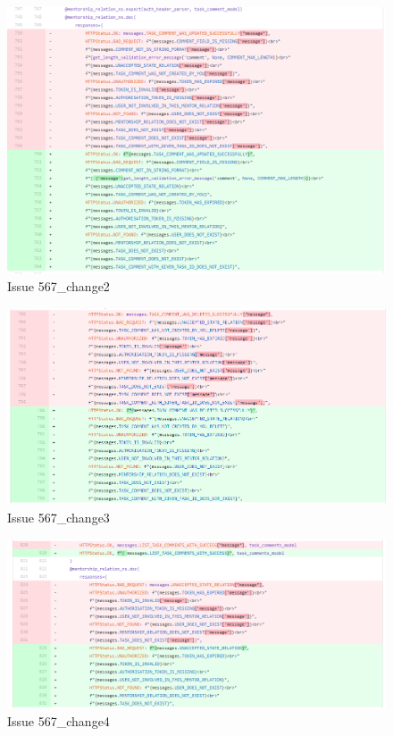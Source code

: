 \documentclass{article}
\begin{document}
\begin{figure}[tph!]
\centerline{\includegraphics[totalheight=15cm, width=16cm]{567Changes_2.png}}
    \caption{Issue 567\_change2}
    \label{fig:verticalcell}
\end{figure}
\begin{figure}[tph!]
\centerline{\includegraphics[totalheight=15cm, width=16cm]{567Changes_3.png}}
    \caption{Issue 567\_change3}
    \label{fig:verticalcell}
\end{figure}
\begin{figure}[tph!]
\centerline{\includegraphics[totalheight=15cm, width=16cm]{567Changes_4.png}}
    \caption{Issue 567\_change4}
    \label{fig:verticalcell}
\end{figure}
\end{document}
